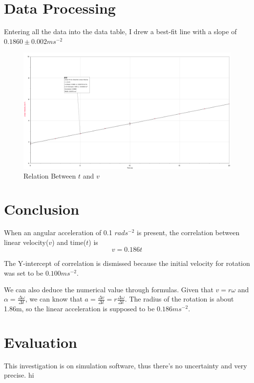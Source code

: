 \documentclass[12pt,a4paper]{article}
\begin{document}
\begin{spacing}{1.25}
\section{Data Processing}
Entering all the data into the data table, I drew a best-fit line with a slope of $ 0.1860 \pm 0.002 ms^{-2}$
\begin{figure}[H] %
    \centering %
    \includegraphics[width=\textwidth]{correlation.png}
    \caption{Relation Between $ t $ and $ v $} %
    \end{figure}
\section{Conclusion}
When an angular acceleration of 0.1 $ rads^{-2} $ is present, the correlation between linear velocity($ v $) and time($ t $) is \[
    v = 0.186t
\]\par
The Y-intercept of correlation is dismissed because the initial velocity for rotation was set to be $ 0.100 ms^{-2} $.\par
We can also deduce the numerical value through formulas.
Given that $ 
    v = r\omega
$ and $ \alpha = \frac{\Delta \omega}{\Delta t} $,
we can know that $ a = \frac{\Delta v}{\Delta t} = r\frac{\Delta \omega}{\Delta t} $. The radius of the rotation is about 1.86m, so the linear acceleration is supposed to be $ 0.186 ms^{-2}$.
\section{Evaluation}
This investigation is on simulation software, thus there's no uncertainty and very precise.
hi
\end{spacing}
\end{document}
